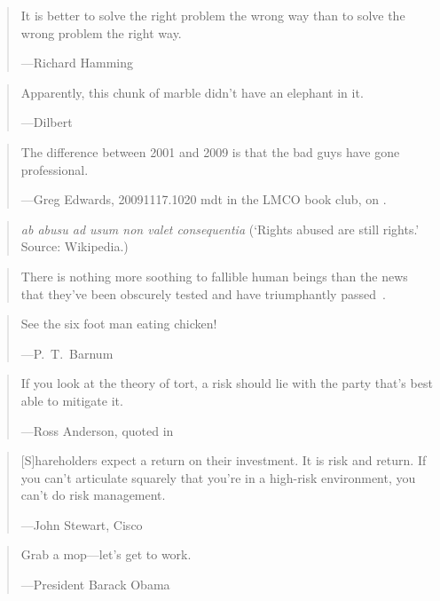 \documentclass[a4paper]{article}
\begin{document}
\medskip
\begin{quote}
	It is better to solve the right problem the wrong way than to
	solve the wrong problem the right way.

	---Richard Hamming
\end{quote}

\medskip
\begin{quote}
	Apparently, this chunk of marble didn't have an elephant in it.

	---Dilbert
\end{quote}

\medskip
\begin{quote}
	The difference between 2001 and 2009 is that the bad guys have
	gone professional.

	---Greg Edwards, 20091117.1020 {\sc mdt} in the LMCO book club,
		on \citep[p.~xx]{Anderson2001}.
\end{quote}

\medskip
\begin{quote}
	{\it ab abusu ad usum non valet consequentia} (`Rights
	abused are still rights.' Source: Wikipedia.)
\end{quote}

\medskip
\begin{quote}
	There is nothing more soothing to fallible human beings
	than the news that they've been obscurely tested and have
	triumphantly passed~\citep[p.~189]{Langford2003}.
\end{quote}

\medskip
\begin{quote}
	See the six foot man eating chicken!

	---P.~T.~Barnum
\end{quote}

\medskip
\begin{quote}
	If you look at the theory of tort, a risk should lie with the
	party that's best able to mitigate it.

	---Ross Anderson, quoted in~\citep{McGraw2007}
\end{quote}

\medskip
\begin{quote}
	[S]hareholders expect a return on their investment.  It is
	risk and return.  If you can't articulate squarely that you're
	in a high-risk environment, you can't do risk management.

	---John Stewart, Cisco~\citep[p.~48]{Johnson2009}
\end{quote}

\medskip
\begin{quote}
	Grab a mop---let's get to work.

	---President Barack Obama
\end{quote}
\end{document}
